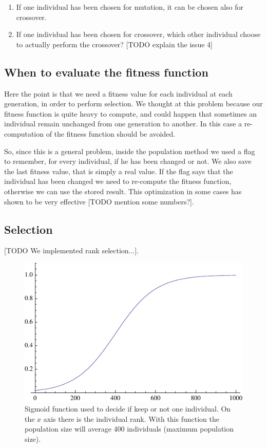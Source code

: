 \documentclass{report}
\begin{document}
\begin{enumerate}
\item If one individual has been chosen for mutation, it can be chosen also for crossover.
\item If one individual has been chosen for crossover, which other individual choose to actually perform the crossover? [TODO explain the issue 4]
\end{enumerate}

\subsection{When to evaluate the fitness function}

Here the point is that we need a fitness value for each individual at each generation, in order to perform selection.
We thought at this problem because our fitness function is quite heavy to compute, and could happen that sometimes an individual remain unchanged from one generation to another. In this case a re-computation of the fitness function should be avoided.

So, since this is a general problem, inside the population method we used a flag to remember, for every individual, if he has been changed or not. We also save the last fitness value, that is simply a real value. If the flag says that the individual has been changed we need to re-compute the fitness function, otherwise we can use the stored result.
This optimization in some cases has shown to be very effective [TODO mention some numbers?].

\subsection{Selection}

[TODO We implemented rank selection...].

\begin{figure}[h]\centering
\includegraphics{figures/decision-function.pdf}
\caption{Sigmoid function used to decide if keep or not one individual. On the $x$ axis there is the individual rank. With this function the population size will average 400 individuals (maximum population size).}
\end{figure}
\end{document}
